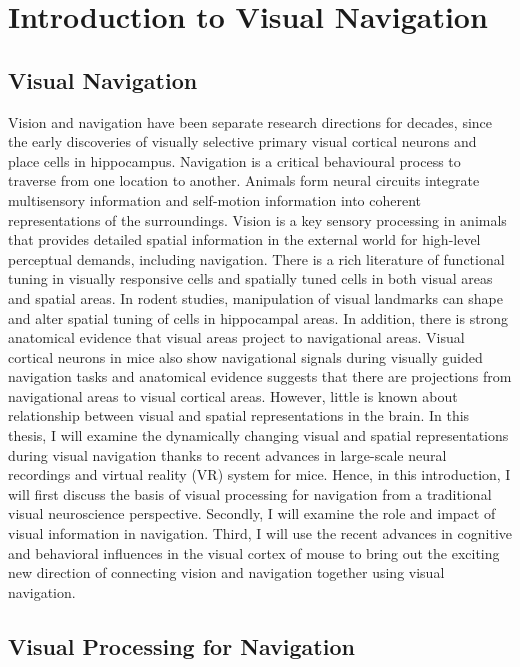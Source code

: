 \chapter{Introduction to Visual Navigation}
\label{chapterlabel1}

\section{Visual Navigation}
Vision and navigation have been separate research directions for decades, since the early discoveries of visually selective primary visual cortical neurons and place cells in hippocampus. Navigation is a critical behavioural process to traverse from one location to another. Animals form neural circuits integrate multisensory information and self-motion information into coherent representations of the surroundings. Vision is a key sensory processing in animals that provides detailed spatial information in the external world for high-level perceptual demands, including navigation. There is a rich literature of functional tuning in visually responsive cells and spatially tuned cells in both visual areas and spatial areas. In rodent studies, manipulation of visual landmarks can shape and alter spatial tuning of cells in hippocampal areas. In addition, there is strong anatomical evidence that visual areas project to navigational areas. Visual cortical neurons in mice also show navigational signals during visually guided navigation tasks and anatomical evidence suggests that there are projections from navigational areas to visual cortical areas. However, little is known about relationship between visual and spatial representations in the brain. In this thesis, I will examine the dynamically changing visual and spatial representations during visual navigation thanks to recent advances in large-scale neural recordings and virtual reality (VR) system for mice. Hence, in this introduction, I will first discuss the basis of visual processing for navigation from a traditional visual neuroscience perspective. Secondly, I will examine the role and impact of visual information in navigation. Third, I will use the recent advances in cognitive and behavioral influences in the visual cortex of mouse to bring out the exciting new direction of connecting vision and navigation together using visual navigation.

\section{Visual Processing for Navigation}
